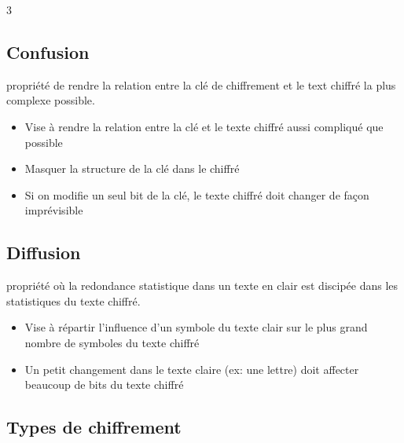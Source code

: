 \documentclass[9pt, a4paper, twoside]{article}
\begin{document}
\begin{multicols}{3}
\footnotesize \subsection{Confusion}

\begin{flushleft}
    \scriptsize propriété de rendre la relation entre la clé de chiffrement et le text chiffré la plus complexe possible.
\end{flushleft}

\begin{itemize}[label={}]
    \item \scriptsize Vise à rendre  la relation entre la clé et le texte chiffré aussi compliqué que possible
    \item \scriptsize Masquer la structure  de la clé dans le chiffré
    \item \scriptsize Si on modifie un seul bit de la clé, le texte chiffré doit changer de façon imprévisible
\end{itemize}

\footnotesize \subsection{Diffusion}

\begin{flushleft}
    \scriptsize propriété où la redondance statistique dans un texte en clair est discipée dans les statistiques du texte chiffré.
\end{flushleft}

\begin{itemize}[label={}]
    \item \scriptsize Vise à répartir l'influence d'un symbole du texte clair sur le plus grand nombre de symboles du texte chiffré
    \item \scriptsize Un petit changement dans le texte claire (ex: une lettre) doit affecter beaucoup de bits du texte chiffré
\end{itemize}

\footnotesize \subsection{Types de chiffrement}


\end{multicols}
\end{document}
